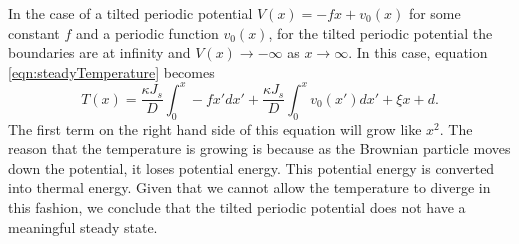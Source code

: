 In the case of a tilted periodic potential $V(x) = -f x + v_0(x)$ for some constant $f$ and a periodic function $v_0(x)$, for the tilted periodic potential the boundaries are at infinity and $V(x) \to -\infty$ as $x \to \infty$. In this case, equation \ref{eqn:steadyTemperature} becomes
\begin{equation}
T(x) = \frac{\kappa J_s}{D} \int_0^x -f x' dx' + \frac{\kappa J_s}{D} \int_0^x v_0(x') dx' + \xi x + d.
\end{equation}
The first term on the right hand side of this equation will grow like $x^2$. The reason that the temperature is growing is because as the Brownian particle moves down the potential, it loses potential energy. This potential energy is converted into thermal energy. Given that we cannot allow the temperature to diverge in this fashion, we conclude that the tilted periodic potential does not have a meaningful steady state.
